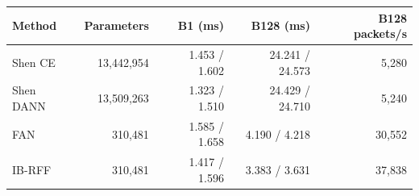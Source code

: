 \begin{tabular}{lrrrr}
\toprule Method & Parameters & B1 (ms) & B128 (ms) & B128 packets/s\\
\midrule
Shen CE & 13,442,954 & 1.453 / 1.602 & 24.241 / 24.573 & 5,280\\
Shen DANN & 13,509,263 & 1.323 / 1.510 & 24.429 / 24.710 & 5,240\\
FAN & 310,481 & 1.585 / 1.658 & 4.190 / 4.218 & 30,552\\
IB-RFF & 310,481 & 1.417 / 1.596 & 3.383 / 3.631 & 37,838\\
\bottomrule
\end{tabular}
